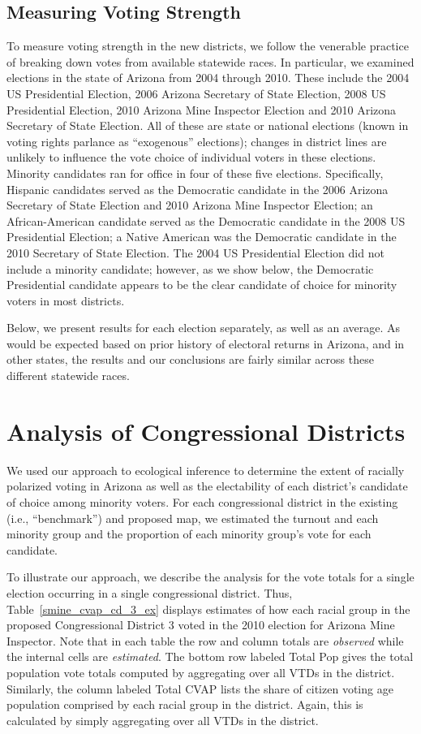 \documentclass[12pt]{scrartcl}
\begin{document}
\subsection{Measuring Voting Strength}

To measure voting strength in the new districts, we follow the
venerable practice of breaking down votes from available statewide
races.  In particular, we examined elections in the state of Arizona
from 2004 through 2010. These include the 2004 US Presidential
Election, 2006 Arizona Secretary of State Election, 2008 US
Presidential Election, 2010 Arizona Mine Inspector Election and 2010
Arizona Secretary of State Election.  All of these are state or
national elections (known in voting rights parlance as ``exogenous''
elections); changes in district lines are unlikely to influence the
vote choice of individual voters in these elections. Minority
candidates ran for office in four of these five elections.
Specifically, Hispanic candidates served as the Democratic candidate
in the 2006 Arizona Secretary of State Election and 2010 Arizona Mine
Inspector Election; an African-American candidate served as the
Democratic candidate in the 2008 US Presidential Election; a Native
American was the Democratic candidate in the 2010 Secretary of State
Election. The 2004 US Presidential Election did not include a minority
candidate; however, as we show below, the Democratic Presidential
candidate appears to be the clear candidate of choice for minority
voters in most districts.  

Below, we present results for each election separately, as well as an
average.  As would be expected based on prior history of electoral
returns in Arizona, and in other states, the results and our
conclusions are fairly similar across these different statewide races.

\section{Analysis of Congressional Districts}

We used our approach to ecological inference to determine the extent
of racially polarized voting in Arizona as well as the electability of
each district's candidate of choice among minority voters. For each
congressional district in the existing (i.e., ``benchmark'') and
proposed map, we estimated the turnout and each minority group and the
proportion of each minority group's vote for each candidate. 

To illustrate our approach, we describe the analysis for the vote
totals for a single election occurring in a single congressional
district.  Thus, Table~\ref{smine_cvap_cd_3_ex} displays estimates of how
each racial group in the proposed Congressional District 3 voted in
the 2010 election for Arizona Mine Inspector. Note that in each table
the row and column totals are {\it observed} while the internal cells
are {\it estimated}. The bottom row labeled Total Pop gives the total
population vote totals computed by aggregating over all VTDs in the
district. Similarly, the column labeled Total CVAP lists the share of
citizen voting age population comprised by each racial group in the
district. Again, this is calculated by simply aggregating over all
VTDs in the district.
\end{document}
